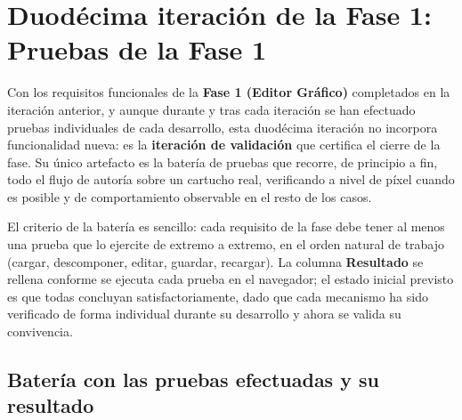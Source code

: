\section{Duodécima iteración de la Fase 1: Pruebas de la Fase 1}
\label{sec:PruebasFase1}

Con los requisitos funcionales de la \textbf{Fase 1 (Editor Gráfico)} completados en la iteración anterior, y aunque durante y tras cada iteración se han efectuado pruebas individuales de cada desarrollo, esta duodécima iteración no incorpora funcionalidad nueva: es la \textbf{iteración de validación} que certifica el cierre de la fase. Su único artefacto es la batería de pruebas que recorre, de principio a fin, todo el flujo de autoría sobre un cartucho real, verificando a nivel de píxel cuando es posible y de comportamiento observable en el resto de los casos.

El criterio de la batería es sencillo: cada requisito de la fase debe tener al menos una prueba que lo ejercite de extremo a extremo, en el orden natural de trabajo (cargar, descomponer, editar, guardar, recargar). La columna \textbf{Resultado} se rellena conforme se ejecuta cada prueba en el navegador; el estado inicial previsto es que todas concluyan satisfactoriamente, dado que cada mecanismo ha sido verificado de forma individual durante su desarrollo y ahora se valida su convivencia.

\subsection{Batería con las pruebas efectuadas y su resultado}
\label{sec:BateriaPruebasFase1}


